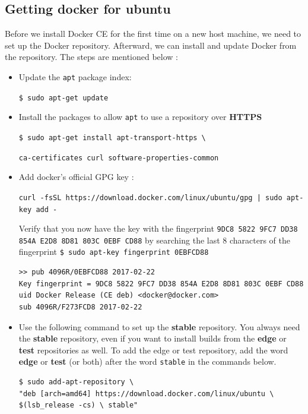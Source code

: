 \subsection{Getting docker for ubuntu}
Before we install Docker CE for the first time on a new host machine, we need to set up the Docker
repository. Afterward, we can install and update Docker from the repository. The steps are
mentioned below :
\begin{itemize}
	\item Update the \verb=apt= package index: \newline \begin{center}{\verb=$ sudo apt-get update=}\end{center}
	\item Install the packages to allow \verb=apt= to use a repository over \textbf{HTTPS}
		\newline \begin{center}{\verb=$ sudo apt-get install apt-transport-https \ =}\end{center}
		\begin{center}{\verb=ca-certificates curl software-properties-common=}\end{center}
	\item Add docker's official GPG key : \newline
		\begin{center}
		\verb=curl -fsSL https://download.docker.com/linux/ubuntu/gpg | sudo apt-key add -=
		\end{center}
		Verify that you now have the key with the fingerprint \verb=9DC8 5822 9FC7 DD38= \newline \verb=854A E2D8 8D81 803C 0EBF CD88= by searching the last 8 characters of the fingerprint\newline\newline
		\verb=$ sudo apt-key fingerprint 0EBFCD88=
		\begin{center}
			\begin{verbatim}
>> pub 4096R/0EBFCD88 2017-02-22
Key fingerprint = 9DC8 5822 9FC7 DD38 854A E2D8 8D81 803C 0EBF CD88
uid Docker Release (CE deb) <docker@docker.com>
sub 4096R/F273FCD8 2017-02-22
			\end{verbatim}
		\end{center}
	\item Use the following command to set up the \textbf{stable} repository. You always need the \textbf{stable}
repository, even if you want to install builds from the \textbf{edge} or \textbf{test} repositories as well. To
add the edge or test repository, add the word \textbf{edge} or \textbf{test} (or both) after the word 
\verb=stable= in the commands below.
		\begin{verbatim}
$ sudo add-apt-repository \
"deb [arch=amd64] https://download.docker.com/linux/ubuntu \
$(lsb_release -cs) \ stable"
		\end{verbatim}
\end{itemize}

